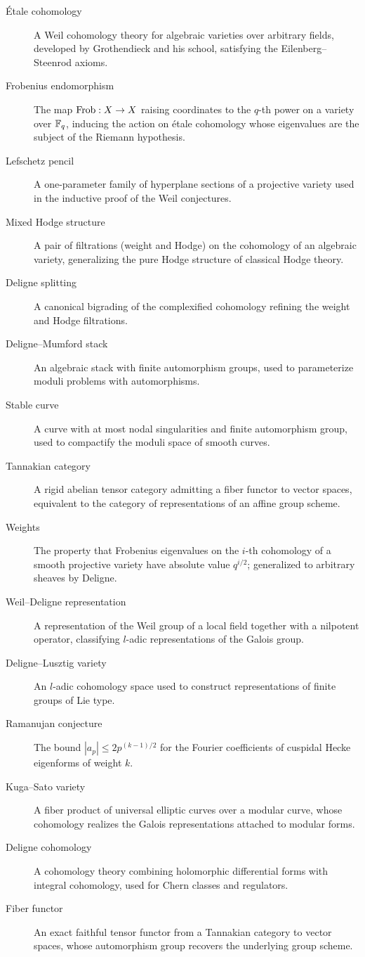 \begin{description}
    \item[\'Etale cohomology] A Weil cohomology theory for algebraic varieties over arbitrary fields, developed by Grothendieck and his school, satisfying the Eilenberg--Steenrod axioms.
    \item[Frobenius endomorphism] The map \(\operatorname{Frob}: X \to X\) raising coordinates to the \(q\)-th power on a variety over \(\mathbb{F}_q\), inducing the action on \'etale cohomology whose eigenvalues are the subject of the Riemann hypothesis.
    \item[Lefschetz pencil] A one-parameter family of hyperplane sections of a projective variety used in the inductive proof of the Weil conjectures.
    \item[Mixed Hodge structure] A pair of filtrations (weight and Hodge) on the cohomology of an algebraic variety, generalizing the pure Hodge structure of classical Hodge theory.
    \item[Deligne splitting] A canonical bigrading of the complexified cohomology refining the weight and Hodge filtrations.
    \item[Deligne--Mumford stack] An algebraic stack with finite automorphism groups, used to parameterize moduli problems with automorphisms.
    \item[Stable curve] A curve with at most nodal singularities and finite automorphism group, used to compactify the moduli space of smooth curves.
    \item[Tannakian category] A rigid abelian tensor category admitting a fiber functor to vector spaces, equivalent to the category of representations of an affine group scheme.
    \item[Weights] The property that Frobenius eigenvalues on the \(i\)-th cohomology of a smooth projective variety have absolute value \(q^{i/2}\); generalized to arbitrary sheaves by Deligne.
    \item[Weil--Deligne representation] A representation of the Weil group of a local field together with a nilpotent operator, classifying \(l\)-adic representations of the Galois group.
    \item[Deligne--Lusztig variety] An \(l\)-adic cohomology space used to construct representations of finite groups of Lie type.
    \item[Ramanujan conjecture] The bound \(|a_p| \leq 2 p^{(k-1)/2}\) for the Fourier coefficients of cuspidal Hecke eigenforms of weight \(k\).
    \item[Kuga--Sato variety] A fiber product of universal elliptic curves over a modular curve, whose cohomology realizes the Galois representations attached to modular forms.
    \item[Deligne cohomology] A cohomology theory combining holomorphic differential forms with integral cohomology, used for Chern classes and regulators.
    \item[Fiber functor] An exact faithful tensor functor from a Tannakian category to vector spaces, whose automorphism group recovers the underlying group scheme.
\end{description}

